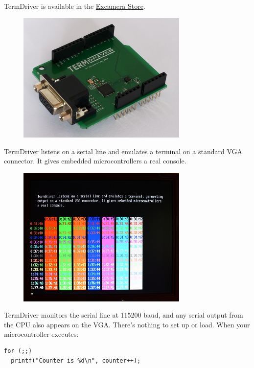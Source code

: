 \documentclass{article}
\begin{document}
\leavevmode\hypertarget{termdriver}{}%
TermDriver is available in the
\href{http://excamera.com/sphinx/gameduino/store.html}{Excamera Store}.

\begin{figure}[h!]
  \centering
  \includegraphics[width=0.75\textwidth]{img/img1}
\end{figure}

TermDriver listens on a serial line and emulates a terminal on a
standard VGA connector. It gives embedded microcontrollers a real
console.

\begin{figure}[h!]
  \centering
  \includegraphics[width=0.75\textwidth]{img/img2}
\end{figure}

TermDriver monitors the serial line at 115200 baud, and any serial
output from the CPU also appears on the VGA. There's nothing to set up
or load. When your microcontroller executes:

\begin{verbatim}
for (;;)
  printf("Counter is %d\n", counter++);
\end{verbatim}
\end{document}
